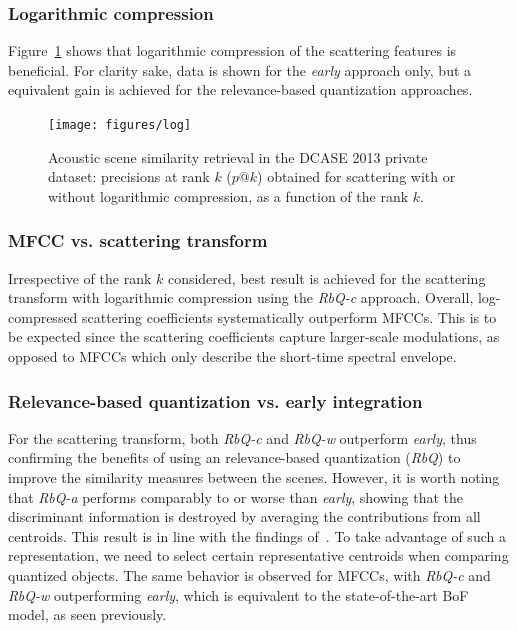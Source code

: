 \documentclass[smallextended]{svjour3}
\makeatletter
\newcommand*{\vs}{vs.\@\xspace}
\newcommand{\ja}[1]{\textcolor{magenta}{Joakim : #1}}
\makeatother
\begin{document}
\subsubsection*{Logarithmic compression}

Figure~\ref{fig:ASS_0} shows that logarithmic compression of the scattering features is beneficial. For clarity sake, data is shown  for the \emph{early} approach only, but a equivalent gain is achieved for the relevance-based quantization approaches. %

\begin{figure}[t]
\begin{center}
\texttt{[image: figures/log]}
\caption{Acoustic scene similarity retrieval in the DCASE 2013 private dataset: precisions at rank $k$ ($p@k$) obtained for scattering with or without logarithmic compression, as a function of the rank $k$.}
\label{fig:ASS_0}
\end{center}
\end{figure}

\subsubsection*{MFCC \vs scattering transform}

Irrespective of the rank $k$ considered, best result is achieved for the scattering transform with logarithmic compression using the \emph{RbQ-c} approach. Overall, log-compressed scattering coefficients systematically outperform MFCCs. This is to be expected since the scattering coefficients capture larger-scale modulations, as opposed to MFCCs which only describe the short-time spectral envelope.

\subsubsection*{Relevance-based quantization \vs early integration}

For the scattering transform, both \emph{RbQ-c} and \emph{RbQ-w} outperform \emph{early}, thus confirming the benefits of using an relevance-based quantization (\emph{RbQ}) to improve the similarity measures between the scenes. However, it is worth noting that \emph{RbQ-a} performs comparably to or worse than \emph{early}, showing that the discriminant information is destroyed by averaging the contributions from all centroids. This result is in line with the findings of~\cite{lagrange:hal-01082501}. To take advantage of such a representation, we need to select certain representative centroids when comparing quantized objects. The same behavior is observed for MFCCs, with \emph{RbQ-c} and \emph{RbQ-w} outperforming \emph{early}, which is equivalent to the state-of-the-art BoF model, as seen previously.
\end{document}
